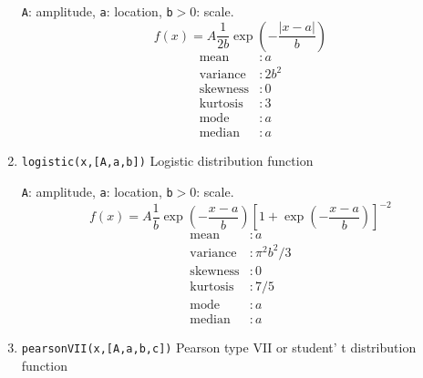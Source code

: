\documentclass[reprint,showpacs,prb,nofootinbib,amsmath,amssymb]{revtex4-1}
\begin{document}
\begin{enumerate}
\verb|A|: amplitude, \verb|a|: location, \verb|b|$>0$: scale. 
\begin{equation}
f(x)=A\frac{1}{2b}\exp\left(-\frac{\left|x-a\right|}{b}\right) \nonumber
\end{equation}
\begin{align}
	\mbox{mean} 		&: \mbox{$a$} \nonumber \\
	\mbox{variance}		&: \mbox{$2b^2$} \nonumber \\
	\mbox{skewness}     &: \mbox{$0$} \nonumber \\
	\mbox{kurtosis}     &: \mbox{$3$}  \nonumber \\
	\mbox{mode}      	&: \mbox{$a$}  \nonumber \\
	\mbox{median}       &: \mbox{$a$}  \nonumber
\end{align}

\item \verb|logistic(x,[A,a,b])| Logistic distribution function~\cite{McLaughlin}

\verb|A|: amplitude, \verb|a|: location, \verb|b|$>0$: scale. 
\begin{equation}
f(x)=A\frac{1}{b}\exp\left(-\frac{x-a}{b}\right)\left[1+\exp\left(-\frac{x-a}{b}\right)\right]^{-2} \nonumber
\end{equation}
\begin{align}
	\mbox{mean} 		&: \mbox{$a$} \nonumber \\
	\mbox{variance}		&: \mbox{$\pi^2b^2/3$} \nonumber \\
	\mbox{skewness}     &: \mbox{$0$} \nonumber \\
	\mbox{kurtosis}     &: \mbox{$7/5$}  \nonumber \\
	\mbox{mode}      	&: \mbox{$a$}  \nonumber \\
	\mbox{median}       &: \mbox{$a$}  \nonumber
\end{align}

\item \verb|pearsonVII(x,[A,a,b,c])| Pearson type VII or student' t distribution function~\cite{McLaughlin,pearsonVII}


\end{enumerate}
\end{document}
